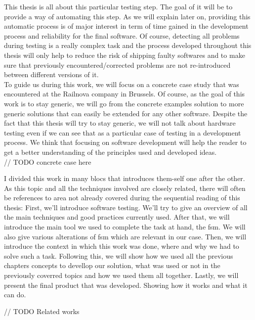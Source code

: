 \documentclass[12pt]{article}
\theoremstyle{definition}
\theoremstyle{definition}
\theoremstyle{remark}
\begin{document}
This thesis is all about this particular testing step. The goal of it will be to provide a way of automating this step. As we will explain later on, providing this automatic process is of major interest in term of time gained in the development process and reliability for the final software. Of course, detecting all problems during testing is a really complex task and the process developed throughout this thesis will only help to reduce the risk of shipping faulty softwares and to make sure that previously encountered/corrected problems are not re-introduced between different versions of it.\\

To guide us during this work, we will focus on a concrete case study that was encountered at the Railnova company in Brussels. Of course, as the goal of this work is to stay generic, we will go from the concrete examples solution to more generic solutions that can easily be extended for any other software. Despite the fact that this thesis will try to stay generic, we will not talk about hardware testing even if we can see that as a particular case of testing in a development process. We think that focusing on software development will help the reader to get a better understanding of the principles used and developed ideas.\\

// TODO concrete case here

I divided this work in many blocs that introduces them-self one after the other. As this topic and all the techniques involved are closely related, there will often be references to area not already covered during the sequential reading of this thesis: First, we'll introduce software testing. We'll try to give an overview of all the main techniques and good practices currently used. After that, we will introduce the main tool we used to complete the task at hand, the \gls{fsm}. We will also give various alterations of \gls{fsm} which are relevant in our case. Then, we will introduce the context in which this work was done, where and why we had to solve such a task. Following this, we will show how we used all the previous chapters concepts to devellop our solution, what was used or not in the previously coverred topics and how we used them all together. Lastly, we will present the final product that was developed. Showing how it works and what it can do.

// TODO Related works

\end{document}
